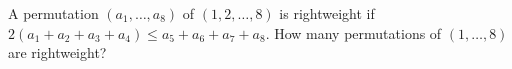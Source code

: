 A permutation $(a_1,\dots,a_8)$ of $(1,2,\dots,8)$ is rightweight if $2(a_1+a_2+a_3+a_4)\le a_5+a_6+a_7+a_8$. How many permutations of $(1,\dots,8)$ are rightweight?
